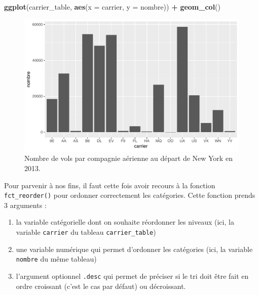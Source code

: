 \documentclass[a4paperpaper,]{article}
\newenvironment{Shaded}{\begin{snugshade}}{\end{snugshade}}
\newcommand{\KeywordTok}[1]{\textcolor[rgb]{0.13,0.29,0.53}{\textbf{#1}}}
\newcommand{\DataTypeTok}[1]{\textcolor[rgb]{0.13,0.29,0.53}{#1}}
\newcommand{\StringTok}[1]{\textcolor[rgb]{0.31,0.60,0.02}{#1}}
\newcommand{\OperatorTok}[1]{\textcolor[rgb]{0.81,0.36,0.00}{\textbf{#1}}}
\newcommand{\NormalTok}[1]{#1}
\providecommand{\tightlist}{%
  \setlength{\itemsep}{0pt}\setlength{\parskip}{0pt}}
\theoremstyle{definition}
\theoremstyle{definition}
\theoremstyle{definition}
\theoremstyle{remark}
\begin{document}
\begin{Shaded}
\begin{Highlighting}[]
\KeywordTok{ggplot}\NormalTok{(carrier_table, }\KeywordTok{aes}\NormalTok{(}\DataTypeTok{x =}\NormalTok{ carrier, }\DataTypeTok{y =}\NormalTok{ nombre)) }\OperatorTok{+}
\StringTok{  }\KeywordTok{geom_col}\NormalTok{()}
\end{Highlighting}
\end{Shaded}

\begin{figure}[htpb]

{\centering \includegraphics[width=0.9\linewidth]{figure/bpcarriercol-1} 

}

\caption{Nombre de vols par compagnie aérienne au départ de New York en 2013.}\label{fig:bpcarriercol}
\end{figure}

Pour parvenir à nos fins, il faut cette fois avoir recours à la fonction
\texttt{fct\_reorder()} pour ordonner correctement les catégories. Cette
fonction prends 3 arguments :

\begin{enumerate}
\def\labelenumi{\arabic{enumi}.}
\tightlist
\item
  la variable catégorielle dont on souhaite réordonner les niveaux (ici,
  la variable \texttt{carrier} du tableau \texttt{carrier\_table})
\item
  une variable numérique qui permet d'ordonner les catégories (ici, la
  variable \texttt{nombre} du même tableau)
\item
  l'argument optionnel \texttt{.desc} qui permet de préciser si le tri
  doit être fait en ordre croissant (c'est le cas par défaut) ou
  décroissant.
\end{enumerate}
\end{document}
